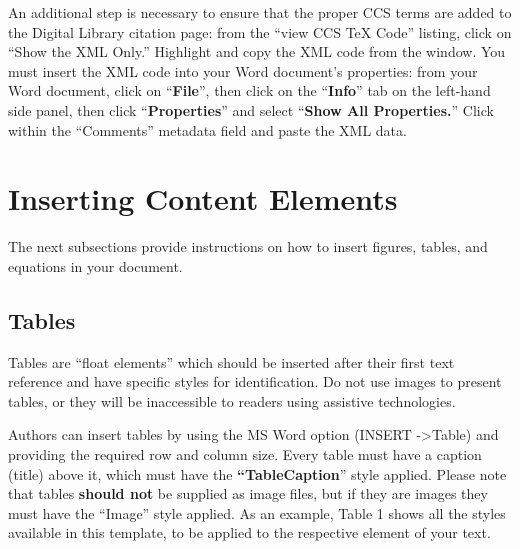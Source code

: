 \documentclass[conference]{IEEEtran}
\begin{document}
An additional step is necessary to ensure that the proper CCS terms are added to the Digital Library citation page: from the “view CCS TeX Code” listing, click on “Show the XML Only.” Highlight and copy the XML code from the window. You must insert the XML code into your Word document’s properties: from your Word document, click on “\textbf{File}”, then click on the “\textbf{Info}” tab on the left-hand side panel, then click “\textbf{Properties}” and select “\textbf{Show All Properties.}” Click within the “Comments” metadata field and paste the XML data.

\section{Inserting Content Elements}

The next subsections provide instructions on how to insert figures, tables, and equations in your document. 

\subsection{Tables}

Tables are “float elements” which should be inserted after their first text reference and have specific styles for identification.  Do not use images to present tables, or they will be inaccessible to readers using assistive technologies.

Authors can insert tables by using the MS Word option (INSERT ->Table) and providing the required row and column size. Every table must have a caption (title) above it, which must have the \textbf{“}\textbf{TableCaption}” style applied. Please note that tables \textbf{should not} be supplied as image files, but if they are images they must have the “Image” style applied. As an example, Table 1 shows all the styles available in this template, to be applied to the respective element of your text.
\end{document}
